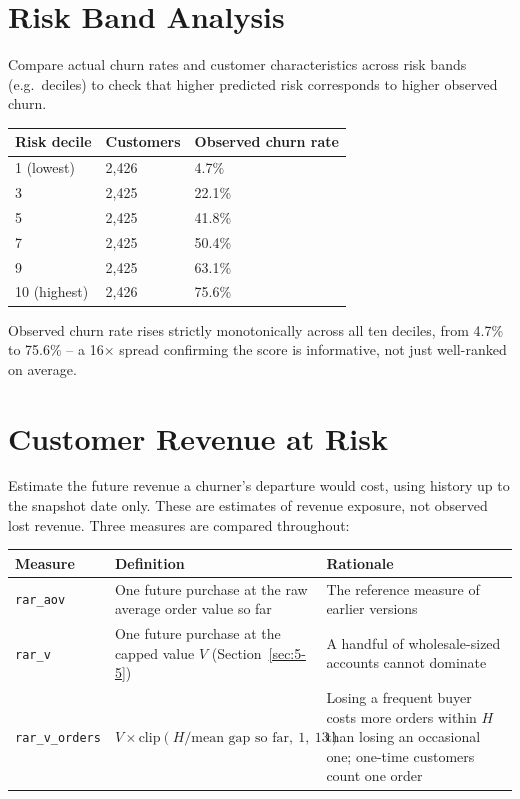 \section{Risk Band Analysis}
\label{sec:7-4}

Compare actual churn rates and customer characteristics across risk bands (e.g.\ deciles) to check that higher predicted risk corresponds to higher observed churn.

\begin{center}
\begin{tabular}{@{}p{3cm}p{3cm}p{3cm}@{}}
    \toprule
    Risk decile & Customers & Observed churn rate \\
    \midrule
    1 (lowest) & 2,426 & 4.7\% \\
    3 & 2,425 & 22.1\% \\
    5 & 2,425 & 41.8\% \\
    7 & 2,425 & 50.4\% \\
    9 & 2,425 & 63.1\% \\
    10 (highest) & 2,426 & 75.6\% \\
    \bottomrule
\end{tabular}
\end{center}

Observed churn rate rises strictly monotonically across all ten deciles, from 4.7\% to 75.6\% -- a 16$\times$ spread confirming the score is informative, not just well-ranked on average.

\section{Customer Revenue at Risk}
\label{sec:7-5}

Estimate the future revenue a churner's departure would cost, using history up to the snapshot date only. These are estimates of revenue exposure, not observed lost revenue. Three measures are compared throughout:

\begin{center}
\begin{tabular}{@{}p{2.6cm}p{5.6cm}p{6cm}@{}}
    \toprule
    Measure & Definition & Rationale \\
    \midrule
    \texttt{rar\_aov} & One future purchase at the raw average order value so far & The reference measure of earlier versions \\
    \texttt{rar\_v} & One future purchase at the capped value $V$ (Section~\ref{sec:5-5}) & A handful of wholesale-sized accounts cannot dominate \\
    \texttt{rar\_v\_orders} & $V \times \text{clip}(H / \text{mean gap so far},\ 1,\ 13)$ & Losing a frequent buyer costs more orders within $H$ than losing an occasional one; one-time customers count one order \\
    \bottomrule
\end{tabular}
\end{center}

